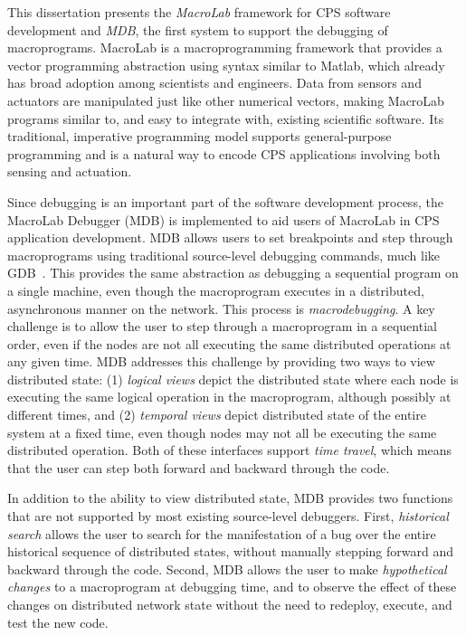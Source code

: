 This dissertation presents the {\em MacroLab} framework for CPS software
development and {\em MDB}, the first system to support the debugging of
macroprograms. MacroLab is a macroprogramming framework that provides a
vector programming abstraction using syntax similar to Matlab, which already has
broad adoption among scientists and engineers.  Data from sensors and actuators
are manipulated just like other numerical vectors, making MacroLab programs
similar to, and easy to integrate with, existing scientific software.  Its
traditional, imperative programming model supports general-purpose programming
and is a natural way to encode CPS applications involving both sensing and
actuation.

Since debugging is an important part of the software development process, the
MacroLab Debugger (MDB) is implemented to aid users of MacroLab in CPS
application development. MDB allows users to set breakpoints and step through
macroprograms using traditional source-level debugging commands, much like
GDB~\cite{gdb}.  This provides the same abstraction as debugging a sequential
program on a single machine, even though the macroprogram executes in a
distributed, asynchronous manner on the network. This process is
\emph{macrodebugging}.  A key challenge is to allow the user to step through a
macroprogram in a sequential order, even if the nodes are not all executing the
same distributed operations at any given time.  MDB addresses this challenge by
providing two ways to view distributed state: (1) \emph{logical views} depict
the distributed state where each node is executing the same logical operation in
the macroprogram, although possibly at different times, and (2) \emph{temporal
views} depict distributed state of the entire system at a fixed time, even
though nodes may not all be executing the same distributed operation.  Both of
these interfaces support {\em time travel}, which means that the user can step
both forward and backward through the code.

In addition to the ability to view distributed state, MDB provides two functions
that are not supported by most existing source-level debuggers.  First,
\emph{historical search} allows the user to search for the manifestation of a
bug over the entire historical sequence of distributed states, without manually
stepping forward and backward through the code.  Second, MDB allows the user to
make \emph{hypothetical changes} to a macroprogram at debugging time, and to
observe the effect of these changes on distributed network state without the
need to redeploy, execute, and test the new code.


